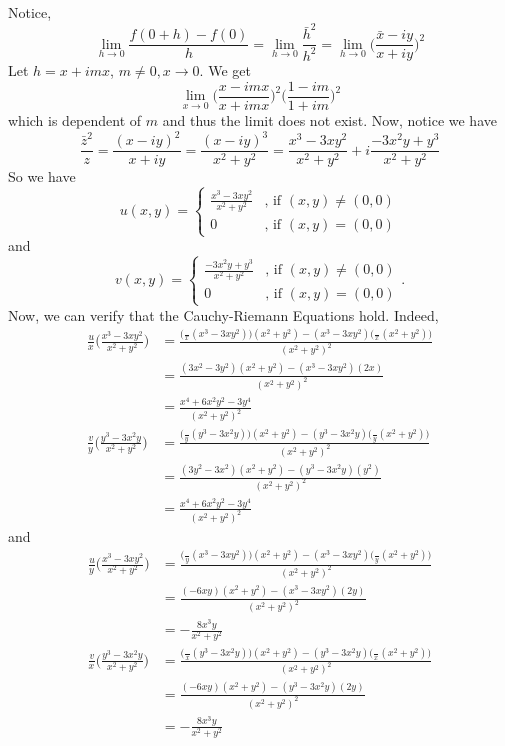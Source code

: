 \documentclass[11pt]{article}
\newcommand*{\pd}[3][]{\ensuremath{\frac{^{#1} #2}{ #3^{#1}}}}
\begin{document}
Notice,
\begin{equation*}
	\lim_{h \to 0} \frac{f(0+h)-f(0)}{h}
	= \lim_{h \to 0} \frac{\bar h^2}{h^2}
	= \lim_{h \to 0} \bigg(\frac{\bar x-iy}{x+iy}\bigg)^2
\end{equation*}
Let $h = x+imx$, $m \neq 0, x \to 0$. We get
\begin{equation*}
	\lim_{x \to 0} \bigg( \frac{x-imx}{x+imx}\bigg)^2
	\bigg( \frac{1-im}{1+im}\bigg)^2
\end{equation*}
which is dependent of $m$ and thus the limit does not exist. Now, notice we have
\begin{equation*}
	\frac{\bar z^2}{z} = \frac{(x-iy)^2}{x+iy} = \frac{(x-iy)^3}{x^2+y^2}
	= \frac{x^3-3xy^2}{x^2+y^2}+i \frac{-3x^2y+y^3}{x^2+y^2}
\end{equation*}
So we have
\begin{equation*}
	u(x,y) =
	\begin{cases}
		\frac{x^3-3xy^2}{x^2+y^2} & \text{, if } (x,y) \neq (0,0)\\
		0 & \text{, if } (x,y) = (0,0)
	\end{cases}
\end{equation*}
and
\begin{equation*}
	v(x,y) =
	\begin{cases}
		\frac{-3x^2y+y^3}{x^2+y^2} & \text{, if } (x,y) \neq (0,0)\\
		0 & \text{, if } (x,y) = (0,0)
	\end{cases}.
\end{equation*}
Now, we can verify that the Cauchy-Riemann Equations hold. Indeed,
\begin{align*}
	\pd{u}{x}\bigg(\frac{x^3-3xy^2}{x^2+y^2}\bigg)
	&= \frac{\big(\pd{}{x}(x^3-3xy^2)\big)(x^2+y^2)-(x^3 -
3xy^2)\big(\pd{}{x}(x^2+y^2)\big)}{(x^2+y^2)^2}\\
&= \frac{(3x^2-3y^2)(x^2+y^2)-(x^3-3xy^2)(2x)}{(x^2+y^2)^2}\\
&= \frac{x^4+6x^2y^2-3y^4}{(x^2+y^2)^2}\\
\pd{v}{y}\bigg(\frac{y^3-3x^2y}{x^2+y^2} \bigg)
&= \frac{\big(\pd{}{y}(y^3-3x^2y)\big)(x^2+y^2)-(y^3 -
3x^2y)\big(\pd{}{y}(x^2+y^2)\big)}{(x^2+y^2)^2}\\
&= \frac{(3y^2-3x^2)(x^2+y^2)-(y^3-3x^2y)(y^2)}{(x^2+y^2)^2}\\
&= \frac{x^4+6x^2y^2-3y^4}{(x^2+y^2)^2}
\end{align*}
and
\begin{align*}
	\pd{u}{y}\bigg(\frac{x^3-3xy^2}{x^2+y^2}\bigg)
	&= \frac{\big(\pd{}{y}(x^3-3xy^2)\big)(x^2+y^2)-(x^3 -
3xy^2)\big(\pd{}{y}(x^2+y^2)\big)}{(x^2+y^2)^2}\\
&= \frac{(-6xy)(x^2+y^2)-(x^3-3xy^2)(2y)}{(x^2+y^2)^2}\\
&= -\frac{8x^3y}{x^2+y^2}\\
\pd{v}{x}\bigg(\frac{y^3-3x^2y}{x^2+y^2} \bigg)
&= \frac{\big(\pd{}{x}(y^3-3x^2y)\big)(x^2+y^2)-(y^3 -
3x^2y)\big(\pd{}{x}(x^2+y^2)\big)}{(x^2+y^2)^2}\\
&= \frac{(-6xy)(x^2+y^2)-(y^3-3x^2y)(2y)}{(x^2+y^2)^2}\\
&= -\frac{8x^3y}{x^2+y^2}
\end{align*}
\end{document}
